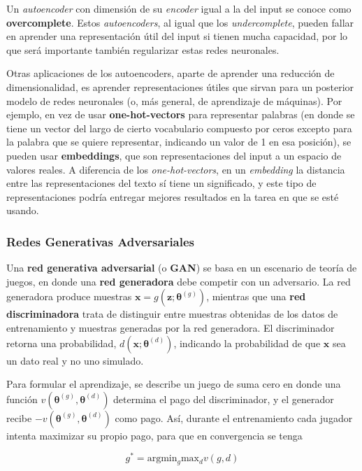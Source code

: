 Un \textit{autoencoder} con dimensi\'on de su \textit{encoder} igual a la del input se conoce como \textbf{overcomplete}. Estos \textit{autoencoders}, al igual que los \textit{undercomplete}, pueden fallar en aprender una representaci\'on \'util del input si tienen mucha capacidad, por lo que ser\'a importante tambi\'en regularizar estas redes neuronales.

Otras aplicaciones de los autoencoders, aparte de aprender una reducci\'on de dimensionalidad, es aprender representaciones \'utiles que sirvan para un posterior modelo de redes neuronales (o, m\'as general, de aprendizaje de m\'aquinas). Por ejemplo, en vez de usar \textbf{one-hot-vectors} para representar palabras (en donde se tiene un vector del largo de cierto vocabulario compuesto por ceros excepto para la palabra que se quiere representar, indicando un valor de 1 en esa posici\'on), se pueden usar \textbf{embeddings}, que son representaciones del input a un espacio de valores reales. A diferencia de los \textit{one-hot-vectors}, en un \textit{embedding} la distancia entre las representaciones del texto s\'i tiene un significado, y este tipo de representaciones podr\'ia entregar mejores resultados en la tarea en que se est\'e usando.

\subsubsection{Redes Generativas Adversariales}

Una \textbf{red generativa adversarial} (o \textbf{GAN}) se basa en un escenario de teor\'ia de juegos, en donde una \textbf{red generadora} debe competir con un adversario. La red generadora produce muestras $\bm{x} = g(\bm{z};\bm{\theta}^{(g)})$, mientras que una \textbf{red discriminadora} trata de distinguir entre muestras obtenidas de los datos de entrenamiento y muestras generadas por la red generadora. El discriminador retorna una probabilidad, $d(\bm{x};\bm{\theta}^{(d)})$, indicando la probabilidad de que $\bm{x}$ sea un dato real y no uno simulado.

Para formular el aprendizaje, se describe un juego de suma cero en donde una funci\'on $v(\bm{\theta}^{(g)},\bm{\theta}^{(d)})$ determina el pago del discriminador, y el generador recibe $-v(\bm{\theta}^{(g)},\bm{\theta}^{(d)})$ como pago. As\'i, durante el entrenamiento cada jugador intenta maximizar su propio pago, para que en convergencia se tenga

\begin{equation}
g^{*} = \textrm{arg} \textrm{min}_{g} \textrm{max}_{d} v(g,d)
\end{equation}

